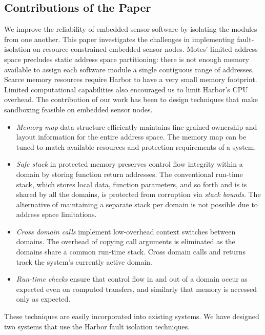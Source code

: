 \subsection{Contributions of the Paper}
%
We improve the reliability of embedded sensor software by isolating
the modules from one another.
%
This paper investigates the challenges in implementing fault-isolation
on resource-constrained embedded sensor nodes.
%
Motes' limited address space precludes static address space partitioning:
there is not enough memory available to assign each software module a
single contiguous range of addresses.
Scarce memory resources require Harbor to have a very small memory
footprint.
%
Limited computational capabilities also encouraged us to limit Harbor's
CPU overhead.
%
The contribution of our work has been to design techniques that make
sandboxing feasible on embedded sensor nodes.
%
\begin{itemize}
%
\item{\emph{Memory map} data structure efficiently maintains
fine-grained ownership and layout information for the entire address
space.
%
The memory map can be tuned to match available resources and protection
requirements of a system.
%
}
%
\item{\textit{Safe stack} in protected memory preserves control flow
integrity within a domain by storing function return addresses.
%
The conventional run-time stack, which stores local data, function
parameters, and so forth and is
%
is shared by all the domains, is protected
from corruption via \emph{stack bounds}.
%
The alternative of maintaining a separate stack per
domain is not possible due to address space limitations.
%
}
%
\item{\textit{Cross domain calls} implement low-overhead
context switches between domains.
%
The overhead of copying call arguments is eliminated as the domains
share a common run-time stack.
%
Cross domain calls and returns track the system's currently active domain.
%
}
%
\item{\textit{Run-time checks} ensure that control flow in and out
of a domain occur as expected even on computed transfers, and
similarly that memory is accessed only as expected.
%
}
%
\end{itemize}

%
These techniques are easily incorporated into existing systems.
%
We have designed two systems that use the Harbor fault isolation
techniques.
%

